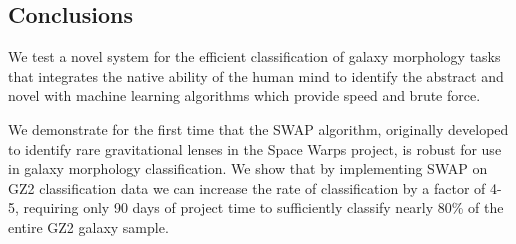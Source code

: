\documentclass[twocolumn]{aastex6}
\begin{document}





\subsection{Conclusions}

We test a novel system for the efficient classification 
of galaxy morphology tasks that integrates the native ability of the human 
mind to identify the abstract and novel with machine learning algorithms which provide
 speed and brute force.  

We demonstrate for the first time that the SWAP algorithm, 
originally developed to identify rare gravitational lenses in the Space Warps project, 
is robust for use in galaxy morphology classification. We show that by implementing
SWAP on GZ2 classification data we can increase the rate of classification by a factor
of 4-5, requiring only 90 days of project time to sufficiently classify nearly 80\% of the
entire GZ2 galaxy sample. 
\end{document}

